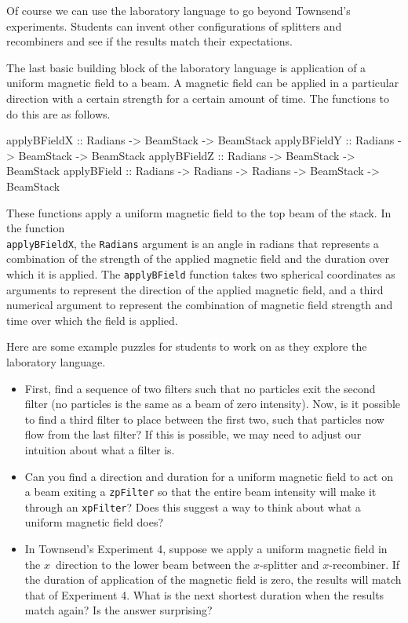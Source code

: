 \documentclass[12pt]{article}
\newcommand{\DataTypeTok}[1]{\textcolor[rgb]{0.56,0.13,0.00}{{#1}}}
\newcommand{\SpecialCharTok}[1]{\textcolor[rgb]{0.25,0.44,0.63}{{#1}}}
\newcommand{\FunctionTok}[1]{\textcolor[rgb]{0.02,0.16,0.49}{{#1}}}
\begin{document}
Of course we can use the laboratory language to go beyond Townsend's
experiments.  Students can invent other configurations of splitters
and recombiners and see if the results match their expectations.

The last basic building block of the laboratory language
is application of a uniform magnetic field to a beam.
A magnetic field can be applied in a particular direction
with a certain strength for a certain amount of time.
The functions to do this are as follows.
\begin{Highlighting}[]
\FunctionTok{applyBFieldX} \SpecialCharTok{::} \DataTypeTok{Radians} \SpecialCharTok{->} \DataTypeTok{BeamStack} \SpecialCharTok{->} \DataTypeTok{BeamStack}
\FunctionTok{applyBFieldY} \SpecialCharTok{::} \DataTypeTok{Radians} \SpecialCharTok{->} \DataTypeTok{BeamStack} \SpecialCharTok{->} \DataTypeTok{BeamStack}
\FunctionTok{applyBFieldZ} \SpecialCharTok{::} \DataTypeTok{Radians} \SpecialCharTok{->} \DataTypeTok{BeamStack} \SpecialCharTok{->} \DataTypeTok{BeamStack}
\FunctionTok{applyBField}  \SpecialCharTok{::} \DataTypeTok{Radians} \SpecialCharTok{->} \DataTypeTok{Radians} \SpecialCharTok{->} \DataTypeTok{Radians} \SpecialCharTok{->} \DataTypeTok{BeamStack} \SpecialCharTok{->} \DataTypeTok{BeamStack}
\end{Highlighting}
These functions apply a uniform magnetic field to the top beam of the stack.
In the function \\
\FunctionTok{\texttt{applyBFieldX}}, the \DataTypeTok{\texttt{Radians}}
argument is an angle in radians that represents a combination of the strength
of the applied magnetic field and the duration over which it is applied.
The \FunctionTok{\texttt{applyBField}} function takes two spherical coordinates as
arguments to represent the direction of the applied magnetic field, and a third
numerical argument to represent the combination of magnetic field strength and
time over which the field is applied.

Here are some example puzzles for students to work on as they
explore the laboratory language.
\begin{itemize}
\item
First, find a sequence of two filters such that no
particles exit the second filter (no particles is the
same as a beam of zero intensity).
Now, is it possible to find a third filter to place
between the first two, such that particles now
flow from the last filter?  If this is possible,
we may need to adjust our intuition about what
a filter is.
\item
Can you find a direction and duration for a uniform magnetic
field to act on a beam exiting a \FunctionTok{\texttt{zpFilter}}
so that the entire beam intensity will make it through an
\FunctionTok{\texttt{xpFilter}}?
Does this suggest a way to think about what a uniform magnetic
field does?
\item
In Townsend's Experiment 4, suppose we apply a uniform magnetic field
in the $x$~direction
to the lower beam between the $x$-splitter and $x$-recombiner.
If the duration of application of the magnetic field is zero,
the results will match that of Experiment 4.  What is the next shortest
duration when the results match again?
Is the answer surprising?
\end{itemize}
\end{document}
